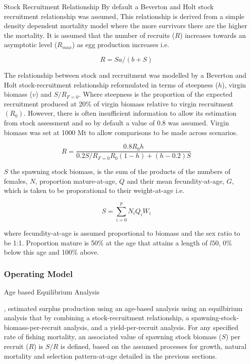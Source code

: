 \documentclass[preprint,12pt]{elsarticle}
\begin{document}
Stock Recruitment Relationship
By default a Beverton and Holt stock recruitment relationship \cite{beverton1993dynamics} was assumed, This relationship is derived from a simple density dependent mortality model where the more survivors there are the higher the mortality. It is assumed that the number of recruits ($R$) increases towards an asymptotic level ($R_{max}$) as egg production increases i.e.  
 
 \begin{equation} R=Sa/(b+S) \end{equation} 


The relationship between stock and recruitment was modelled by a Beverton and Holt stock-recruitment relationship \cite{beverton1993dynamics} reformulated in terms of steepness ($h$), virgin biomass ($v$) and $S/R_{F=0}$. Where steepness is the proportion of the expected recruitment produced at 20\% of virgin biomass relative to virgin recruitment  $(R_0)$. However, there is often insufficient information to allow its estimation from stock assessment \cite{pepin2015reconsidering} and so by default a value of 0.8 was assumed. Virgin biomass was set at 1000 Mt to allow comparisons to be made across scenarios.

\begin{equation}
R=\frac{0.8R_0h}{0.2S/R_{F=0}R_0(1-h)+(h-0.2)S}
\end{equation} 

$S$ the spawning stock biomass, is the sum of the products of the numbers of females, $N$, proportion mature-at-age, $Q$ and their mean fecundity-at-age, $G$, which is taken to be proporational to their weight-at-age i.e. 

\begin{equation} S = \sum\limits_{i=0}^{p} {N_iQ_iW_i} \end{equation}

where fecundity-at-age is assumed proportional to biomass and the sex ratio to be 1:1. Proportion mature is 50\% at the age that attains a length of $l50$, 0\% below this age and 100\% above. 


\subsubsection{Operating Model}

Age based Equilibrium Analysis 

\cite{sissenwine1987alternative}, estimated surplus production using an age-based analysis using an equilbirium analysis that by combining a stock-recruitment relationship, a spawning-stock-biomass-per-recruit analysis, and a yield-per-recruit analysis. For any specified rate of fishing mortality, an associated value of spawning stock biomass ($S$) per recruit ($R$) is $S/R$ is defined, based on the assumed processes for growth, natural mortality and selection pattern-at-age detailed in the previous sections.
\end{document}

